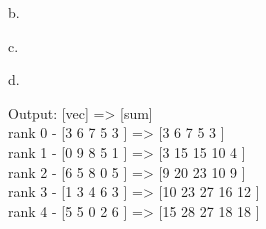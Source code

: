 b.


c.

d. 

Output:  [vec] => [sum] \\
rank 0 - [3 6 7 5 3 ] => [3 6 7 5 3 ] \\
rank 1 - [0 9 8 5 1 ] => [3 15 15 10 4 ] \\
rank 2 - [6 5 8 0 5 ] => [9 20 23 10 9 ] \\
rank 3 - [1 3 4 6 3 ] => [10 23 27 16 12 ] \\
rank 4 - [5 5 0 2 6 ] => [15 28 27 18 18 ] \\

